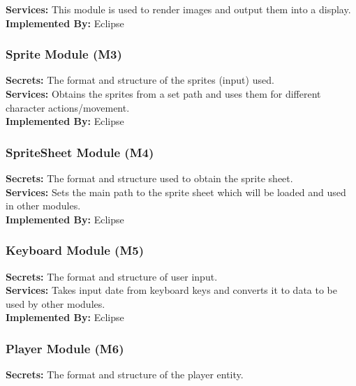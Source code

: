 \documentclass[12pt, letterpaper]{article}
\begin{document}
	\noindent \textbf{Services:} This module is used to render images and output them into a \indent display.\\
	
	\noindent \textbf{Implemented By:} Eclipse
	
	\subsubsection{Sprite Module (M3)}
	\noindent \textbf{Secrets:} The format and structure of the sprites (input) used.\\
	
	\noindent \textbf{Services:} Obtains the sprites from a set path and uses them for different \indent character actions/movement.\\
	
	\noindent \textbf{Implemented By:} Eclipse
	
	\subsubsection{SpriteSheet Module (M4)}
	\noindent \textbf{Secrets:} The format and structure used to obtain the sprite sheet.\\
	
	\noindent \textbf{Services:} Sets the main path to the sprite sheet which will be loaded and \indent used in other modules.\\
	
	\noindent \textbf{Implemented By:} Eclipse
	
	\subsubsection{Keyboard Module (M5)}
	\noindent \textbf{Secrets:} The format and structure of user input.\\
	
	\noindent \textbf{Services:} Takes input date from keyboard keys and converts it to data to \indent be used by other modules.\\
	
	\noindent \textbf{Implemented By:} Eclipse
	
	\subsubsection{Player Module (M6)}
	\noindent \textbf{Secrets:} The format and structure of the player entity.\\
	
\end{document}

